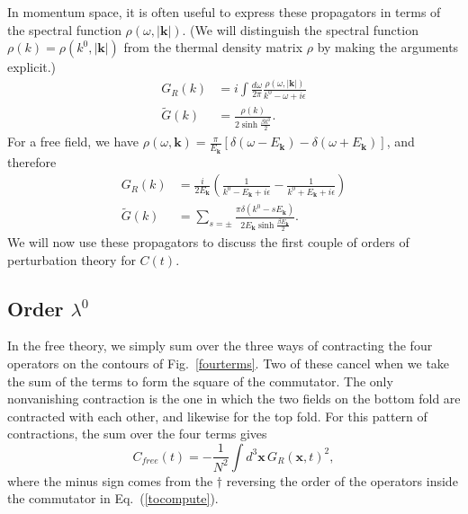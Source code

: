 \documentclass[12pt]{article}
\newcommand{\be}{\begin{equation}}
\newcommand{\ee}{\end{equation}}
\renewcommand{\k}{\mathbf{k}}
\begin{document}
In momentum space, it is often useful to express these propagators in terms of the spectral function $\rho(\omega,|\k|)$. (We will distinguish the spectral function $\rho(k) = \rho(k^0,|\k|)$ from the thermal density matrix $\rho$ by making the arguments explicit.)
\begin{align}
G_R(k) &= i\int \frac{d\omega}{2\pi}\frac{\rho(\omega, |\k|)}{k^0 - \omega + i\epsilon}\\
\tilde{G}(k) &= \frac{\rho(k)}{2\sinh \frac{\beta k^0}{2}}.
\end{align}
For a free field, we have $\rho(\omega,\k) = \frac{\pi}{E_{\k}}[\delta(\omega-E_{\k}) - \delta(\omega + E_{\k})]$, and therefore
\begin{align}
G_R(k) &= \frac{i}{2E_{\k}}\left(\frac{1}{k^0 - E_{\k}+i\epsilon} - \frac{1}{k^0 + E_{\k} + i\epsilon}\right)\label{retardedG}\\
\tilde{G}(k) &= \sum_{s = \pm}\frac{\pi\delta(k^0-sE_\k)}{2E_\k\sinh\frac{\beta E_\k}{2}}.\label{tildeG}
\end{align}
We will now use these propagators to discuss the first couple of orders of perturbation theory for $C(t)$.

\subsection{Order $\lambda^0$}\label{free}
In the free theory, we simply sum over the three ways of contracting the four operators on the contours of Fig.~\ref{fourterms}. Two of these cancel when we take the sum of the terms to form the square of the commutator. The only nonvanishing contraction is the one in which the two fields on the bottom fold are contracted with each other, and likewise for the top fold. For this pattern of contractions, the sum over the four terms gives
\be
C_{free}(t) = -\frac{1}{N^2}\int d^3\mathbf{x} \, G_R(\mathbf{x},t)^2,
\ee
where the minus sign comes from the $\dagger$ reversing the order of the operators inside the commutator in Eq.~(\ref{tocompute}). 
\end{document}
